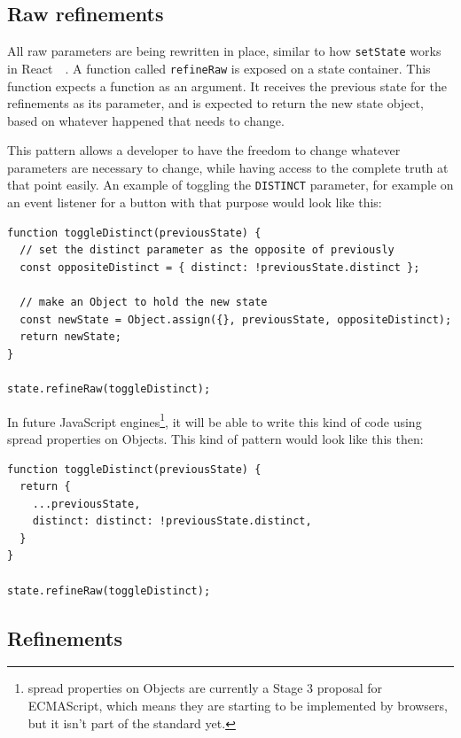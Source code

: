 \subsection{Raw refinements}
\label{ssec:raw-refinments}

All raw parameters are being rewritten in place, similar to how {\tt setState} works in React~\cite{react-doc-state}~. A function called {\tt refineRaw} is exposed on a state container. This function expects a function as an argument. It receives the previous state for the refinements as its parameter, and is expected to return the new state object, based on whatever happened that needs to change.

This pattern allows a developer to have the freedom to change whatever parameters are necessary to change, while having access to the complete truth at that point easily. An example of toggling the {\tt DISTINCT} parameter, for example on an event listener for a button with that purpose would look like this:

\begin{lstlisting}[caption={Toggling the {\tt DISTINCT} parameter},label={lst:is-core-raw}]
function toggleDistinct(previousState) {
  // set the distinct parameter as the opposite of previously
  const oppositeDistinct = { distinct: !previousState.distinct };

  // make an Object to hold the new state
  const newState = Object.assign({}, previousState, oppositeDistinct);
  return newState;
}

state.refineRaw(toggleDistinct);
\end{lstlisting}

In future JavaScript engines\footnote{spread properties on Objects are currently a Stage 3 proposal for ECMAScript\cite{es-prop-spread}, which means they are starting to be implemented by browsers, but it isn't part of the standard yet.}, it will be able to write this kind of code using spread properties on Objects. This kind of pattern would look like this then:

\begin{lstlisting}[caption={Toggling the {\tt DISTINCT} parameter when object spread is available},label={lst:is-core-raw}]
function toggleDistinct(previousState) {
  return {
    ...previousState,
    distinct: distinct: !previousState.distinct,
  }
}

state.refineRaw(toggleDistinct);
\end{lstlisting}

\subsection{Refinements}
\label{ssec:refinments}

